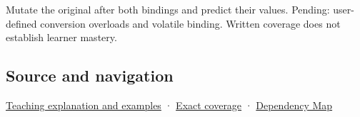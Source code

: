 Mutate the original after both bindings and predict their values. Pending: user-defined conversion overloads and volatile binding. Written coverage does not establish learner mastery.

\subsection{Source and navigation}\label{appendix-37856d997bb0-source-and-navigation}

\hyperref[01-foundations-i-ch003-binding-chooses-a-referent-not-always-the-one-you-imagined]{Teaching explanation and examples} · \hyperref[appendix-fd090d982a15-m008---parts-113-126]{Exact coverage} · \hyperref[appendix-4ad47bdd269a]{Dependency Map}
